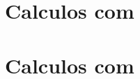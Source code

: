 \documentclass[13pt, xcolor={dvipsnames,svgnames}, portuguese]{beamer}
\begin{document}
\section{Calculos com }



\section{Calculos com }










\end{document}
